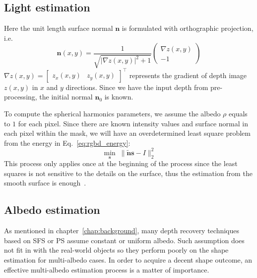 \subsection{Light estimation}
Here the unit length surface normal $\mathbf{n}$ is formulated with orthographic projection, i.e. 
\begin{equation}\label{eq:rgbd_normal}
    \mathbf{n}(x,y) = \frac{1}{\sqrt{|\nabla z(x,y)|^2 + 1}}
    \begin{pmatrix} 
         \nabla z(x,y)\\ 
         -1
     \end{pmatrix}
\end{equation}
$\nabla z(x,y) = \begin{bmatrix} z_x(x,y)& z_y(x,y) \end{bmatrix}^\top$ represents the gradient of depth image $z(x,y)$ in $x$ and $y$ directions.
Since we have the input depth from pre-processing, the initial normal $\mathbf{n}_0$ is known.


To compute the spherical harmonics parameters, we assume the albedo $\rho$ equals to $1$ for each pixel. 
Since there are known intensity values and surface normal in each pixel within the mask, we will have an overdetermined least square problem from the energy in Eq.~\ref{eq:rgbd_energy}: 
\begin{equation}\label{eq:rgbd_light_estimate}
\min_{\mathbf{s}} \; \lVert \tilde{\mathbf{n}} \mathbf{s} - I \rVert^2_2
\end{equation}
This process only applies once at the beginning of the process since the least squares is not sensitive to the details on the surface, thus the estimation from the smooth surface is enough~\cite{or2015rgbd}.

\subsection{Albedo estimation}\label{sec:rgbd_albedo_estimation}
As mentioned in chapter~\ref{chap:background}, many depth recovery techniques based on SFS or PS assume constant or uniform albedo.
Such assumption does not fit in with the real-world objects so they perform poorly on the shape estimation for multi-albedo cases.
In order to acquire a decent shape outcome, an effective multi-albedo estimation process is a matter of importance.

